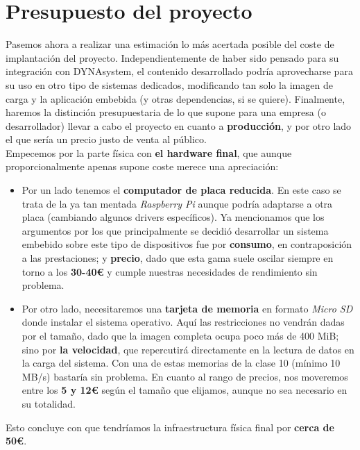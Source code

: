 \chapter{Presupuesto del proyecto}

Pasemos ahora a realizar una estimación lo más acertada posible del coste de implantación del proyecto. Independientemente de haber sido pensado para su integración con DYNAsystem, el contenido desarrollado podría aprovecharse para su uso en otro tipo de sistemas dedicados, modificando tan solo la imagen de carga y la aplicación embebida (y otras dependencias, si se quiere). Finalmente, haremos la distinción presupuestaria de lo que supone para una empresa (o desarrollador) llevar a cabo el proyecto en cuanto a \textbf{producción}, y por otro lado el que sería un precio justo de venta al público.\\

Empecemos por la parte física con \textbf{el hardware final}, que aunque proporcionalmente apenas supone coste merece una apreciación:

\begin{itemize}
	\item Por un lado tenemos el \textbf{computador de placa reducida}. En este caso se trata de la ya tan mentada \textit{Raspberry Pi} aunque podría adaptarse a otra placa (cambiando algunos drivers específicos). Ya mencionamos que los argumentos por los que principalmente se decidió desarrollar un sistema embebido sobre este tipo de dispositivos fue por \textbf{consumo}, en contraposición a las prestaciones; y \textbf{precio}, dado que esta gama suele oscilar siempre en torno a los \textbf{30-40€} \cite{raspberry-pi-amazon} y cumple nuestras necesidades de rendimiento sin problema.
	\item Por otro lado, necesitaremos una \textbf{tarjeta de memoria} en formato \textit{Micro SD} donde instalar el sistema operativo. Aquí las restricciones no vendrán dadas por el tamaño, dado que la imagen completa ocupa poco más de 400 MiB; sino por \textbf{la velocidad}, que repercutirá directamente en la lectura de datos en la carga del sistema. Con una de estas memorias de la clase 10 (mínimo 10 MB/s) bastaría sin problema. En cuanto al rango de precios, nos moveremos entre los \textbf{5 y 12€} según el tamaño que elijamos, aunque no sea necesario en su totalidad.
\end{itemize}

Esto concluye con que tendríamos la infraestructura física final por \textbf{cerca de 50€}.\\

